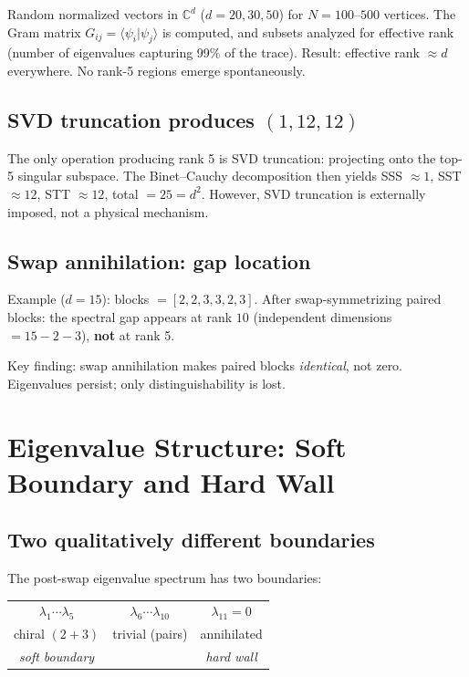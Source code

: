 \documentclass[12pt]{article}
\theoremstyle{remark}
\begin{document}
Random normalized vectors in $\mathbb{C}^d$ ($d = 20, 30, 50$) for $N = 100$--$500$ vertices. The Gram matrix $G_{ij} = \langle\psi_i|\psi_j\rangle$ is computed, and subsets analyzed for effective rank (number of eigenvalues capturing 99\% of the trace). Result: effective rank $\approx d$ everywhere. No rank-5 regions emerge spontaneously.

\subsection{SVD truncation produces $(1, 12, 12)$}

The only operation producing rank 5 is SVD truncation: projecting onto the top-5 singular subspace. The Binet--Cauchy decomposition then yields SSS $\approx 1$, SST $\approx 12$, STT $\approx 12$, total $= 25 = d^2$. However, SVD truncation is externally imposed, not a physical mechanism.

\subsection{Swap annihilation: gap location}

Example ($d=15$): blocks $= [2, 2, 3, 3, 2, 3]$. After swap-symmetrizing paired blocks: the spectral gap appears at rank $10$ (independent dimensions $= 15 - 2 - 3$), \textbf{not} at rank 5.

Key finding: swap annihilation makes paired blocks \emph{identical}, not zero. Eigenvalues persist; only distinguishability is lost.

\section{Eigenvalue Structure: Soft Boundary and Hard Wall}

\subsection{Two qualitatively different boundaries}

The post-swap eigenvalue spectrum has two boundaries:

\begin{center}
\begin{tabular}{ccc}
$\lambda_1 \cdots \lambda_5$ & $\lambda_6 \cdots \lambda_{10}$ & $\lambda_{11} = 0$ \\
chiral $(2+3)$ & trivial (pairs) & annihilated \\
\emph{soft boundary} & & \emph{hard wall} \\
\end{tabular}
\end{center}
\end{document}

